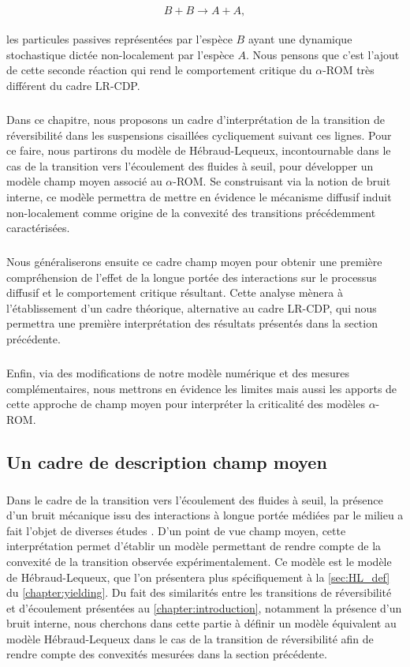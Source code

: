 \begin{equation}
	B +B \xrightarrow[]{} A + A,
	\label{eq:meca_diff}
\end{equation}

\noindent les particules passives représentées par l'espèce $B$ ayant une dynamique stochastique dictée non-localement par l'espèce $A$. Nous pensons que c'est l'ajout de cette seconde réaction qui rend le comportement critique du $\alpha$-ROM très différent du cadre LR-CDP.

\subparagraph{}Dans ce chapitre, nous proposons un cadre d'interprétation de la transition de réversibilité dans les suspensions cisaillées cycliquement suivant ces lignes. Pour ce faire, nous partirons du modèle de Hébraud-Lequeux, incontournable dans le cas de la transition vers l'écoulement des fluides à seuil, pour développer un modèle champ moyen associé au $\alpha$-ROM. Se construisant via la notion de bruit interne, ce modèle permettra de mettre en évidence le mécanisme diffusif induit non-localement comme origine de la convexité des transitions précédemment caractérisées.

\subparagraph{}Nous généraliserons ensuite ce cadre champ moyen pour obtenir une première compréhension de  l'effet de la longue portée des interactions sur le processus diffusif et le comportement critique résultant. Cette analyse mènera à l'établissement d'un cadre théorique, alternative au cadre LR-CDP, qui nous permettra une première interprétation des résultats présentés dans la section précédente. 

\subparagraph{}Enfin, via des modifications de notre modèle numérique et des mesures complémentaires, nous mettrons en évidence les limites mais aussi les apports de cette approche de champ moyen pour interpréter la criticalité des modèles $\alpha$-ROM.

\subsection{Un cadre de description champ moyen}

\subparagraph{}Dans le cadre de la transition vers l'écoulement des fluides à seuil, la présence d'un bruit mécanique issu des interactions à longue portée médiées par le milieu a fait l'objet de diverses études \cite{lin_mean-field_2016, ferrero_criticality_2019}. D'un point de vue champ moyen, cette interprétation permet d'établir un modèle permettant de rendre compte de la convexité de la transition observée expérimentalement. Ce modèle est le modèle de Hébraud-Lequeux\cite{hebraud_mode_coupling_1998}, que l'on présentera plus spécifiquement à la \autoref{sec:HL_def} du \autoref{chapter:yielding}. Du fait des similarités entre les transitions de réversibilité et d'écoulement présentées au \autoref{chapter:introduction}, notamment la présence d'un bruit interne, nous cherchons dans cette partie à définir un modèle équivalent au modèle Hébraud-Lequeux dans le cas de la transition de réversibilité afin de rendre compte des convexités mesurées dans la section précédente.

